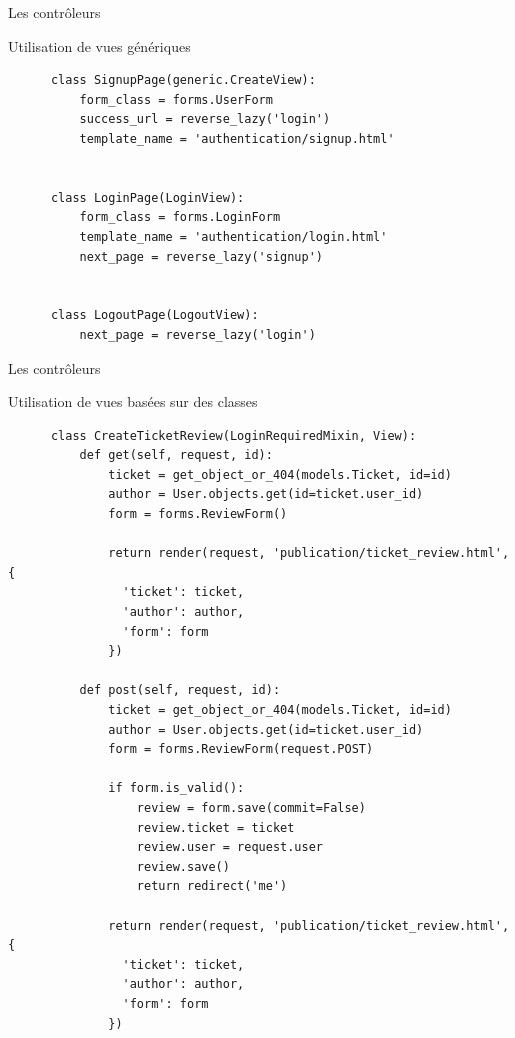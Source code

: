 \begin{frame}[fragile]{Les contrôleurs}
  \begin{block}{Utilisation de vues génériques}
    \tiny
    \begin{lstlisting}
      class SignupPage(generic.CreateView):
          form_class = forms.UserForm
          success_url = reverse_lazy('login')
          template_name = 'authentication/signup.html'


      class LoginPage(LoginView):
          form_class = forms.LoginForm
          template_name = 'authentication/login.html'
          next_page = reverse_lazy('signup')


      class LogoutPage(LogoutView):
          next_page = reverse_lazy('login')

    \end{lstlisting}
  \end{block}
\end{frame}

\begin{frame}[fragile]{Les contrôleurs}
  \begin{block}{Utilisation de vues basées sur des classes}
    \tiny
    \begin{lstlisting}
      class CreateTicketReview(LoginRequiredMixin, View):
          def get(self, request, id):
              ticket = get_object_or_404(models.Ticket, id=id)
              author = User.objects.get(id=ticket.user_id)
              form = forms.ReviewForm()
              
              return render(request, 'publication/ticket_review.html', {
                'ticket': ticket,
                'author': author,
                'form': form
              })

          def post(self, request, id):
              ticket = get_object_or_404(models.Ticket, id=id)
              author = User.objects.get(id=ticket.user_id)
              form = forms.ReviewForm(request.POST)
              
              if form.is_valid():
                  review = form.save(commit=False)
                  review.ticket = ticket
                  review.user = request.user
                  review.save()
                  return redirect('me')
              
              return render(request, 'publication/ticket_review.html', {
                'ticket': ticket,
                'author': author,
                'form': form
              })
    \end{lstlisting}
  \end{block}
\end{frame}

